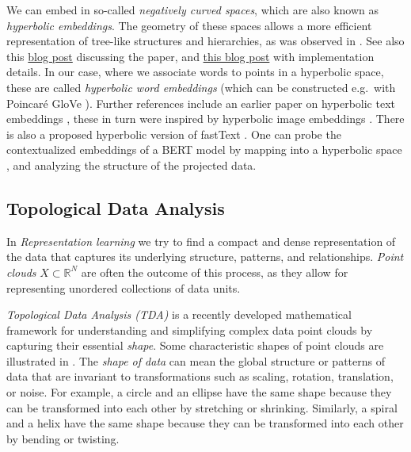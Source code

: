 \documentclass[11pt, a4paper]{amsart}
\begin{document}
We can embed in so-called \emph{negatively curved spaces}, which are also known as \emph{hyperbolic embeddings}.
The geometry of these spaces allows a more efficient representation of tree-like structures and hierarchies, as was observed in \cite{DBLP:journals/corr/NickelK17}.
See also this \href{https://bjlkeng.github.io/posts/hyperbolic-geometry-and-poincare-embeddings/}{blog post} discussing the paper, and \href{https://rare-technologies.com/implementing-poincare-embeddings/}{this blog post} with implementation details.
In our case, where we associate words to points in a hyperbolic space, these are called \emph{hyperbolic word embeddings} (which can be constructed e.g.\ with Poincar{\'e} GloVe \cite{DBLP:journals/corr/abs-1810-06546}).
Further references include an earlier paper on hyperbolic text embeddings \cite{DBLP:journals/corr/abs-1806-04313},
these in turn were inspired by hyperbolic image embeddings \cite{DBLP:journals/corr/abs-1904-02239}.
There is also a proposed hyperbolic version of fastText \cite{zhu-etal-2020-hypertext}.
One can probe the contextualized embeddings of a BERT model by mapping into a hyperbolic space \cite{DBLP:journals/corr/abs-2104-03869}, and analyzing the structure of the projected data.

\subsection{Topological Data Analysis}

In \emph{Representation learning} we try to find a compact and dense representation of the data that captures its underlying structure, patterns, and relationships.
\emph{Point clouds} $X \subset \mathbb{R}^{N}$ are often the outcome of this process, as they allow for representing unordered collections of data units.

\emph{Topological Data Analysis (TDA)} \cite{carlsson2022topologicaldataanalysis} is a recently developed mathematical framework for understanding and simplifying complex data point clouds by capturing their essential \emph{shape}.
Some characteristic shapes of point clouds are illustrated in .
The \emph{shape of data} can mean the global structure or patterns of data that are invariant to transformations such as scaling, rotation, translation, or noise.
For example, a circle and an ellipse have the same shape because they can be transformed into each other by stretching or shrinking. 
Similarly, a spiral and a helix have the same shape because they can be transformed into each other by bending or twisting.
\end{document}
